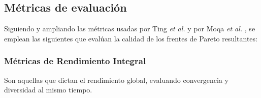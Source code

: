 \subsection{Métricas de evaluación}

Siguiendo y ampliando las métricas usadas por Ting \textit{et al.} \cite{ting2010multi} y por Moqa \textit{et al.} \cite{moqa2022assessing}, se emplean las siguientes que evalúan la calidad de los frentes de Pareto resultantes:

\subsubsection{Métricas de Rendimiento Integral}

Son aquellas que dictan el rendimiento global, evaluando convergencia y diversidad al mismo tiempo.

